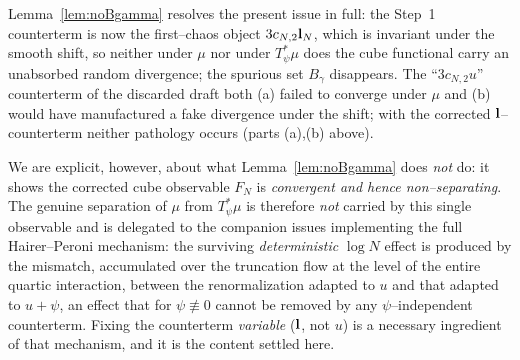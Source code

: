 \begin{remark}\label{rem:event}
Lemma~\ref{lem:noBgamma} resolves the present issue in full: the Step~1 counterterm is
now the first--chaos object $3c_{N,2}\mathbf{l}_N$, which is invariant under the smooth
shift, so neither under $\mu$ nor under $T_\psi^*\mu$ does the cube functional carry an
unabsorbed random divergence; the spurious set $B_\gamma$ disappears. The
``$3c_{N,2}u$'' counterterm of the discarded draft both (a) failed to converge under
$\mu$ and (b) would have manufactured a fake divergence under the shift; with the
corrected $\mathbf{l}$--counterterm neither pathology occurs (parts (a),(b) above).

We are explicit, however, about what Lemma~\ref{lem:noBgamma} does \emph{not} do: it
shows the corrected cube observable $F_N$ is \emph{convergent and hence
non--separating}. The genuine separation of $\mu$ from $T_\psi^*\mu$ is therefore
\emph{not} carried by this single observable and is delegated to the companion issues
implementing the full Hairer--Peroni mechanism: the surviving \emph{deterministic}
$\log N$ effect is produced by the mismatch, accumulated over the truncation flow at
the level of the entire quartic interaction, between the renormalization adapted to
$u$ and that adapted to $u+\psi$, an effect that for $\psi\not\equiv0$ cannot be
removed by any $\psi$--independent counterterm. Fixing the counterterm \emph{variable}
($\mathbf{l}$, not $u$) is a necessary ingredient of that mechanism, and it is the
content settled here.
\end{remark}


